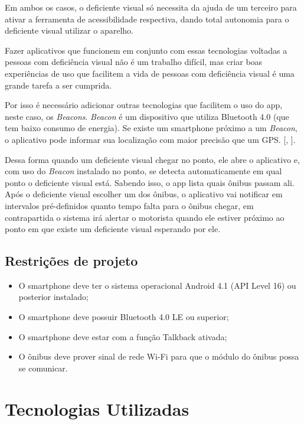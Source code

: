 \documentclass[
	12pt,				%
	oneside,			%
	a4paper,			%
	brazil				%
]{abntex2}
\newcommand{\citecustom}[1]{[\citeauthoronline{#1}, \citeyear{#1}]}
\begin{document}
Em ambos os casos, o deficiente visual só necessita da ajuda de um terceiro para ativar a ferramenta de acessibilidade respectiva, dando total autonomia para o deficiente visual utilizar o aparelho.

Fazer aplicativos que funcionem em conjunto com essas tecnologias voltadas a pessoas com deficiência visual não é um trabalho difícil, mas criar boas experiências de uso que facilitem a vida de pessoas com deficiência visual é uma grande tarefa a ser cumprida.

Por isso é necessário adicionar outras tecnologias que facilitem o uso do app, neste caso, os \textit{Beacons}. \textit{Beacon} é um dispositivo que utiliza Bluetooth 4.0 (que tem baixo consumo de energia). Se existe um smartphone próximo a um \textit{Beacon}, o aplicativo pode informar sua localização com maior precisão que um GPS. \citecustom{beacon}.

Dessa forma quando um deficiente visual chegar no ponto, ele abre o aplicativo e, com uso do \textit{Beacon} instalado no ponto, se detecta automaticamente em qual ponto o deficiente visual está. Sabendo isso, o app lista quais ônibus passam ali. Após o deficiente visual escolher um dos ônibus, o aplicativo vai notificar em intervalos pré-definidos quanto tempo falta para o ônibus chegar, em contrapartida o sistema irá alertar o motorista quando ele estiver próximo ao ponto em que existe um deficiente visual esperando por ele.

\section{Restrições de projeto}

\begin{itemize}
\item O smartphone deve ter o sistema operacional Android 4.1 (API Level 16) ou posterior instalado;
\item O smartphone deve possuir Bluetooth 4.0 LE ou superior;
\item O smartphone deve estar com a função Talkback ativada;
\item O ônibus deve prover sinal de rede Wi-Fi para que o módulo do ônibus possa se comunicar.
\end{itemize}

\chapter{Tecnologias Utilizadas}
\end{document}
